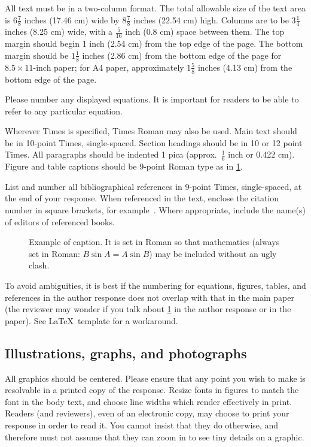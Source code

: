 \documentclass[10pt,twocolumn,letterpaper]{article}
\begin{document}
All text must be in a two-column format.
The total allowable size of the text area is $6\frac78$ inches (17.46 cm) wide by $8\frac78$ inches (22.54 cm) high.
Columns are to be $3\frac14$ inches (8.25 cm) wide, with a $\frac{5}{16}$ inch (0.8 cm) space between them.
The top margin should begin 1 inch (2.54 cm) from the top edge of the page.
The bottom margin should be $1\frac{1}{8}$ inches (2.86 cm) from the bottom edge of the page for $8.5 \times 11$-inch paper;
for A4 paper, approximately $1\frac{5}{8}$ inches (4.13 cm) from the bottom edge of the page.

Please number any displayed equations.
It is important for readers to be able to refer to any particular equation.

Wherever Times is specified, Times Roman may also be used.
Main text should be in 10-point Times, single-spaced.
Section headings should be in 10 or 12 point Times.
All paragraphs should be indented 1 pica (approx.~$\frac{1}{6}$ inch or 0.422 cm).
Figure and table captions should be 9-point Roman type as in \cref{fig:onecol}.


List and number all bibliographical references in 9-point Times, single-spaced,
at the end of your response.
When referenced in the text, enclose the citation number in square brackets, for example~\cite{Alpher05}.
Where appropriate, include the name(s) of editors of referenced books.

\begin{figure}[t]
  \centering
  \fbox{\rule{0pt}{0.5in} \rule{0.9\linewidth}{0pt}}
   \caption{Example of caption.  It is set in Roman so that mathematics
   (always set in Roman: $B \sin A = A \sin B$) may be included without an
   ugly clash.}
   \label{fig:onecol}
\end{figure}

To avoid ambiguities, it is best if the numbering for equations, figures, tables, and references in the author response does not overlap with that in the main paper (the reviewer may wonder if you talk about \cref{fig:onecol} in the author response or in the paper).
See \LaTeX\ template for a workaround.

\subsection{Illustrations, graphs, and photographs}

All graphics should be centered.
Please ensure that any point you wish to make is resolvable in a printed copy of the response.
Resize fonts in figures to match the font in the body text, and choose line widths which render effectively in print.
Readers (and reviewers), even of an electronic copy, may choose to print your response in order to read it.
You cannot insist that they do otherwise, and therefore must not assume that they can zoom in to see tiny details on a graphic.
\end{document}
